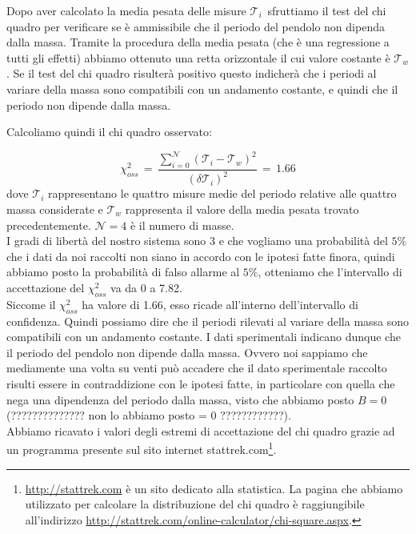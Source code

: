 Dopo aver calcolato la media pesata delle misure $\mathcal{T}_i\,$ sfruttiamo il test del chi quadro per verificare se
è ammissibile che il periodo del pendolo non dipenda dalla massa. Tramite la procedura della media pesata (che è una regressione
a tutti gli effetti) abbiamo ottenuto
una retta orizzontale il cui valore costante è $\mathcal{T}_w$. Se il test del chi quadro risulterà positivo questo indicherà
che i periodi al variare della massa sono compatibili con un andamento costante, e quindi che il periodo non dipende dalla massa.


%
Calcoliamo quindi il chi quadro osservato:

\begin{equation*}
	\chi_{oss}^2 \,=\, \frac{\sum_{i=0}^{\mathcal{N}} (\mathcal{T}_i - \mathcal{T}_w)^2}{(\delta \mathcal{T}_i)^2} \,=\, 1.66
\end{equation*}
%
dove $\mathcal{T}_i$ rappresentano le quattro misure medie del periodo relative alle quattro massa considerate e $\mathcal{T}_w$ rappresenta il valore della media pesata trovato precedentemente. $\mathcal{N} = 4$ è il numero di masse.\\

I gradi di libertà del nostro sistema sono 3 e che vogliamo una probabilità del $5\%$ che i dati da noi raccolti non siano in accordo con le ipotesi fatte finora, quindi abbiamo posto la probabilità di falso allarme al $5\%$, otteniamo che l'intervallo di accettazione del $\chi_{oss}^2$ va da 0 a 7.82.\\
Siccome il $\chi_{oss}^2$ ha valore di 1.66, esso ricade all'interno dell'intervallo di confidenza. Quindi possiamo dire che il periodi rilevati
al variare della massa sono compatibili con un andamento costante. I dati sperimentali indicano dunque che
il periodo del pendolo non dipende dalla massa. Ovvero noi sappiamo che mediamente una volta su venti può accadere che il dato sperimentale raccolto risulti essere in contraddizione con le ipotesi fatte, in particolare con quella che nega una dipendenza del periodo dalla massa, visto che abbiamo posto $B = 0$ (?????????????? non lo abbiamo posto = 0 ????????????).\\
Abbiamo ricavato i valori degli estremi di accettazione del chi quadro grazie ad un programma presente sul sito internet stattrek.com\footnote{
\url{http://stattrek.com} è un sito dedicato alla statistica. La pagina che abbiamo utilizzato per calcolare la distribuzione del chi quadro
è raggiungibile all'indirizzo \url{http://stattrek.com/online-calculator/chi-square.aspx}.
}.
